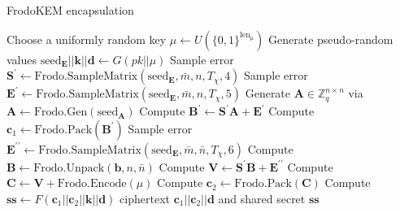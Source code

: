 \begin{algorithm}[t]
\caption{FrodoKEM encapsulation} \label{alg:encaps}
  \begin{algorithmic}[1]
	\State Choose a uniformly random key $\mu \leftarrow U(\{0,1\}^{\text{len}_\mu})$
	\State Generate pseudo-random values $\text{seed}_\mathbf{E} || \mathbf{k} || \mathbf{d} \leftarrow G(pk || \mu)$
	\State Sample error $\mathbf{S}^\prime \leftarrow \text{Frodo.SampleMatrix}(\text{seed}_\mathbf{E},\bar{m},n,T_\chi,4)$
	\State Sample error $\mathbf{E}^\prime \leftarrow \text{Frodo.SampleMatrix}(\text{seed}_\mathbf{E},\bar{m},n,T_\chi,5)$
	 \State Generate $\mathbf{A} \in \mathbb{Z}^{n \times n}_{q}$ via $\mathbf{A} \leftarrow \text{Frodo.Gen}(\text{seed}_\mathbf{A})$
	 \State Compute $\mathbf{B}^\prime \leftarrow \mathbf{S}^\prime \mathbf{A} + \mathbf{E}^\prime$
	 \State Compute $\mathbf{c}_1 \leftarrow \text{Frodo.Pack}(\mathbf{B}^\prime)$
	 \State Sample error $\mathbf{E}^{\prime\prime} \leftarrow \text{Frodo.SampleMatrix}(\text{seed}_\mathbf{E},\bar{m},\bar{n},T_\chi,6	)$
	 \State Compute $\mathbf{B} \leftarrow \text{Frodo.Unpack}(\mathbf{b},n,\bar{n})$
	 \State Compute $\mathbf{V} \leftarrow \mathbf{S}^\prime \mathbf{B} + \mathbf{E}^{\prime\prime}$
	 \State Compute $\mathbf{C} \leftarrow \mathbf{V} + \text{Frodo.Encode}(\mu)$
	 \State Compute $\mathbf{c}_2 \leftarrow \text{Frodo.Pack}(\mathbf{C})$
	 \State Compute $\mathbf{ss} \leftarrow F(\mathbf{c}_1 || \mathbf{c}_2 || \mathbf{k} || \mathbf{d})$
	\State \Return ciphertext $\mathbf{c}_1 || \mathbf{c}_2 || \mathbf{d}$ and shared secret $\mathbf{ss}$
    \EndProcedure
    \end{algorithmic}
\end{algorithm}

